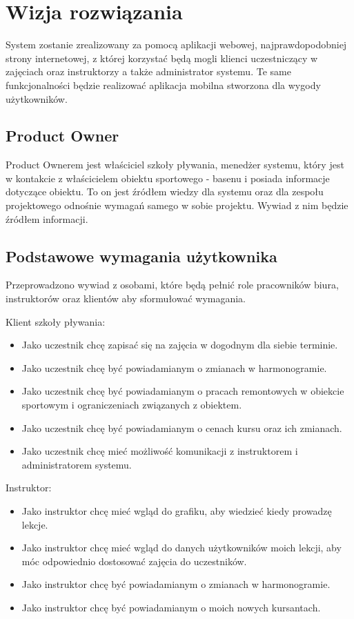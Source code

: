 \documentclass[a4paper,12pt]{article}
\begin{document}
\section{Wizja rozwiązania}

System zostanie zrealizowany za pomocą aplikacji webowej, najprawdopodobniej strony internetowej, z której korzystać będą mogli klienci uczestniczący w zajęciach oraz instruktorzy a także administrator systemu. Te same funkcjonalności będzie realizować aplikacja mobilna stworzona dla wygody użytkowników.

\subsection{Product Owner}

Product Ownerem jest właściciel szkoły pływania, menedżer systemu, który jest w kontakcie z właścicielem obiektu sportowego - basenu i posiada informacje dotyczące obiektu. To on jest źródłem wiedzy dla systemu oraz dla zespołu projektowego odnośnie wymagań samego w sobie projektu. Wywiad z nim będzie źródłem informacji.

\subsection{Podstawowe wymagania użytkownika}

Przeprowadzono wywiad z osobami, które będą pełnić role pracowników biura, instruktorów oraz klientów aby sformułować wymagania.

Klient szkoły pływania:

\begin{itemize}
    \item Jako uczestnik chcę zapisać się na zajęcia w dogodnym dla siebie terminie.
    \item Jako uczestnik chcę być powiadamianym o zmianach w harmonogramie.
    \item Jako uczestnik chcę być powiadamianym o pracach remontowych w obiekcie sportowym i ograniczeniach związanych z obiektem.
    \item Jako uczestnik chcę być powiadamianym o cenach kursu oraz ich zmianach.
        \item Jako uczestnik chcę mieć możliwość komunikacji z instruktorem i administratorem systemu.
\end{itemize}

\noindent Instruktor:

\begin{itemize}[label]
    \item Jako instruktor chcę mieć wgląd do grafiku, aby wiedzieć kiedy prowadzę lekcje.
    \item Jako instruktor chcę mieć wgląd do danych użytkowników moich lekcji, aby móc odpowiednio dostosować zajęcia do uczestników.
    \item Jako instruktor chcę być powiadamianym o zmianach w harmonogramie.
    \item Jako instruktor chcę być powiadamianym o moich nowych kursantach.
\end{itemize}
\end{document}
